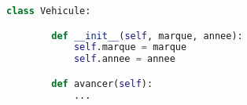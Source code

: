 \begin{lstlisting}[language=Python, caption=Définition de classe en Python, label=el:vehicule]
    class Vehicule:

        def __init__(self, marque, annee):
            self.marque = marque
            self.annee = annee

        def avancer(self):
            ...
\end{lstlisting}